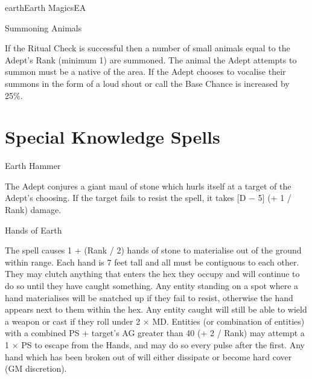 \begin{College}[1.2]{earth}{Earth Magics}{EA}
\begin{ritual}[Q-1]{Summoning Animals}
\begin{effects}
If the Ritual Check is successful then a number of small animals equal
to the Adept’s Rank (minimum 1) are summoned. The animal the Adept
attempts to summon must be a native of the area. If the Adept chooses
to vocalise their summons in the form of a loud shout or call the Base
Chance is increased by 25\%.
\end{effects}
\end{ritual}

\section{Special Knowledge Spells}

\begin{spell}[S-1]{Earth Hammer}

\begin{effects}
The Adept conjures a giant maul of stone which hurls itself at a
target of the Adept’s choosing. If the target fails to resist the
spell, it takes [D − 5] (+ 1 / Rank) damage.
\end{effects}
\end{spell}

\begin{spell}[S-2]{Hands of Earth}

\begin{effects}
The spell causes 1 + (Rank / 2) hands of stone to materialise out of
the ground within range.  Each hand is 7 feet tall and all must be
contiguous to each other. They may clutch anything that enters the hex
they occupy and will continue to do so until they have caught
something.  Any entity standing on a spot where a hand materialises
will be snatched up if they fail to resist, otherwise the hand appears
next to them within the hex.  Any entity caught will still be able to
wield a weapon or cast if they roll under 2 × MD. Entities (or
combination of entities) with a combined PS + target’s AG greater than
40 (+ 2 / Rank) may attempt a 1 × PS to escape from the Hands, and may
do so every pulse after the first.  Any hand which has been broken out
of will either dissipate or become hard cover (GM discretion).
\end{effects}
\end{spell}


\end{College}
